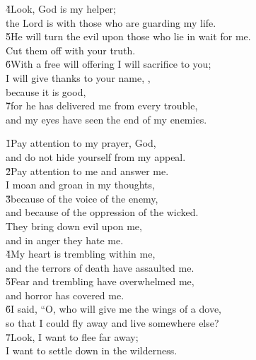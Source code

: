 \begin{poetry}
\poeml \v{4}Look, God is my helper; \\
\poemll    the Lord is with those who are guarding my life. \\
\poeml \v{5}He will turn the evil upon those who lie in wait for me. \\
\poemll    Cut them off with your truth. \\
\poeml \v{6}With a free will offering I will sacrifice to you; \\
\poemll    I will give thanks to your name, , \\
\poemlll       because it is good, \\
\poeml \v{7}for he has delivered me from every trouble, \\
\poemll    and my eyes have seen the end of my enemies.
\end{poetry}

\begin{poetry}
\poeml \v{1}Pay attention to my prayer, God, \\
\poemll    and do not hide yourself from my appeal. \\
\poeml \v{2}Pay attention to me and answer me. \\
\poemll    I moan and groan in my thoughts, \\
\poeml \v{3}because of the voice of the enemy, \\
\poeml and because of the oppression of the wicked. \\
\poeml They bring down evil upon me, \\
\poemll    and in anger they hate me. \\
\poeml \v{4}My heart is trembling within me, \\
\poemll    and the terrors of death have assaulted me. \\
\poeml \v{5}Fear and trembling have overwhelmed me, \\
\poemll    and horror has covered me. \\
\poeml \v{6}I said, ``O, who will give me the wings of a dove, \\
\poemll    so that I could fly away and live somewhere else? \\
\poeml \v{7}Look, I want to flee far away; \\
\poemll    I want to settle down in the wilderness.
\end{poetry}

